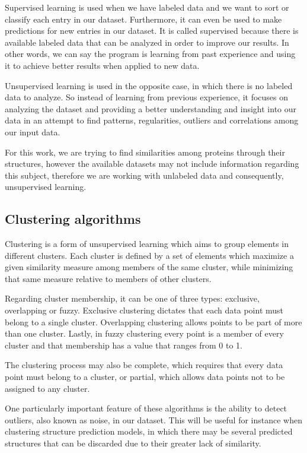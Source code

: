Supervised learning is used when we have labeled data and we want to sort or classify each entry in our dataset. Furthermore, it can even be used to make predictions for new entries in our dataset. It is called supervised because there is available labeled data that can be analyzed in order to improve our results. In other words, we can say the program is learning from past experience and using it to achieve better results when applied to new data.

Unsupervised learning is used in the opposite case, in which there is no labeled data to analyze. So instead of learning from previous experience, it focuses on analyzing the dataset and providing a better understanding and insight into our data in an attempt to find patterns, regularities, outliers and correlations among our input data.

For this work, we are trying to find similarities among proteins through their structures, however the available datasets may not include information regarding this subject, therefore we are working with unlabeled data and consequently, unsupervised learning.

\medskip
\subsection{Clustering algorithms}

Clustering is a form of unsupervised learning which aims to group elements in different clusters. Each cluster is defined by a set of elements which maximize a given similarity measure among members of the same cluster, while minimizing that same measure relative to members of other clusters.

Regarding cluster membership, it can be one of three types: exclusive, overlapping or fuzzy. Exclusive clustering dictates that each data point must belong to a single cluster. Overlapping clustering allows points to be part of more than one cluster. Lastly, in fuzzy clustering every point is a member of every cluster and that membership has a value that ranges from 0 to 1. 

The clustering process may also be complete, which requires that every data point must belong to a cluster, or partial, which allows data points not to be assigned to any cluster.

One particularly important feature of these algorithms is the ability to detect outliers, also known as noise, in our dataset. This will be useful for instance when clustering structure prediction models, in which there may be several predicted structures that can be discarded due to their greater lack of similarity.

